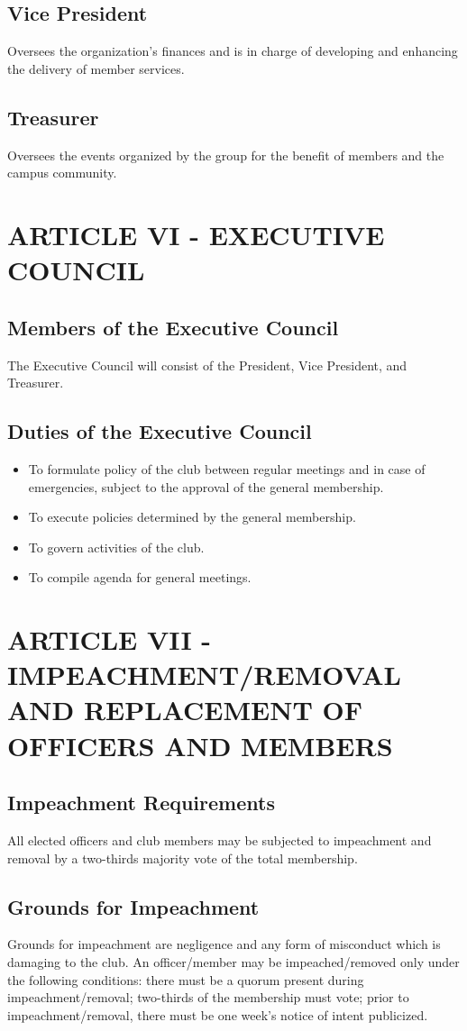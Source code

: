 \documentclass[11pt]{amsart}
\begin{document}
\subsection{Vice President}
Oversees the organization’s finances and is in charge of developing and enhancing the delivery of member services.
\subsection{Treasurer}
Oversees the events organized by the group for the benefit of members and the campus community.

\section{ARTICLE VI - EXECUTIVE COUNCIL}
\subsection{Members of the Executive Council}
The Executive Council will consist of the President, Vice President, and Treasurer.

\subsection{Duties of the Executive Council}
\begin{itemize}
\item{To formulate policy of the club between regular meetings and in case of emergencies, subject to the approval of the general membership.}
\item{To execute policies determined by the general membership.}
\item{To govern activities of the club.}
\item{To compile agenda for general meetings.}
\end{itemize}

\section{ARTICLE VII - IMPEACHMENT/REMOVAL AND REPLACEMENT
OF OFFICERS AND MEMBERS}
\subsection{Impeachment Requirements}
All elected officers and club members may be subjected to impeachment and removal by a two-thirds majority vote of the total membership.
\subsection{Grounds for Impeachment}
Grounds for impeachment are negligence and any form of misconduct which is damaging to the club.  An officer/member may be impeached/removed only under the following conditions: there must be a quorum present during impeachment/removal; two-thirds of the membership must vote; prior to impeachment/removal, there must be one week's notice of intent publicized.
\end{document}
